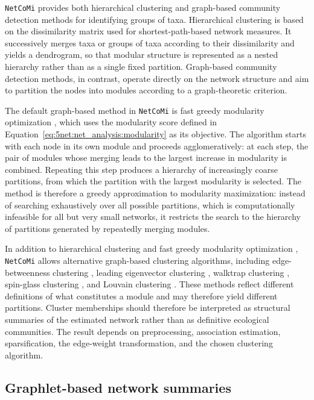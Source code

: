 \texttt{NetCoMi} provides both hierarchical clustering and graph-based community detection methods for identifying groups of taxa. Hierarchical clustering is based on the dissimilarity matrix used for shortest-path-based network measures. It successively merges taxa or groups of taxa according to their dissimilarity and yields a dendrogram, so that modular structure is represented as a nested hierarchy rather than as a single fixed partition. Graph-based community detection methods, in contrast, operate directly on the network structure and aim to partition the nodes into modules according to a graph-theoretic criterion.

The default graph-based method in \texttt{NetCoMi} is fast greedy modularity optimization \citep{clauset2004finding}, which uses the modularity score defined in Equation~\eqref{eq:5net:net_analysis:modularity} as its objective. The algorithm starts with each node in its own module and proceeds agglomeratively: at each step, the pair of modules whose merging leads to the largest increase in modularity is combined. Repeating this step produces a hierarchy of increasingly coarse partitions, from which the partition with the largest modularity is selected. The method is therefore a greedy approximation to modularity maximization: instead of searching exhaustively over all possible partitions, which is computationally infeasible for all but very small networks, it restricts the search to the hierarchy of partitions generated by repeatedly merging modules.

In addition to hierarchical clustering and fast greedy modularity optimization \citep{clauset2004finding}, \texttt{NetCoMi} allows alternative graph-based clustering algorithms, including edge-betweenness clustering \citep{girvan2002community}, leading eigenvector clustering \citep{newman2006finding}, walktrap clustering \citep{pons2005computing}, spin-glass clustering \citep{reichardt2006statistical}, and Louvain clustering \citep{blondel2008fast}. These methods reflect different definitions of what constitutes a module and may therefore yield different partitions. Cluster memberships should therefore be interpreted as structural summaries of the estimated network rather than as definitive ecological communities. The result depends on preprocessing, association estimation, sparsification, the edge-weight transformation, and the chosen clustering algorithm.

\subsection{Graphlet-based network summaries}
\label{sec:5net:net_analysis:graphlets}

